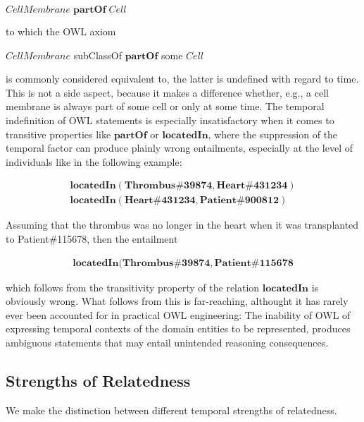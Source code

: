 \documentclass[10pt]{bmc_article}
\newcommand{\mirel}[1]{\ensuremath{\mathrm{\mathbf{#1}}}}
\newcommand{\mclass}[1]{\ensuremath{\mathit{#1}}}
\newenvironment{bmcformat}{\baselineskip20pt\sloppy\setboolean{publ}{false}}{\baselineskip20pt\sloppy}
\begin{document}
\begin{bmcformat}
$\mclass{CellMembrane}\;\mirel{partOf}\;\mclass{Cell}$ 

to which the   
OWL axiom

$\mclass{CellMembrane}$ subClassOf $\mirel{partOf}$ some $\mclass{Cell}$

is commonly considered equivalent to, the latter is 
undefined with regard to time. This is not a side aspect, because it makes a 
difference whether, e.g., a cell membrane is always part of some cell or 
only at some time. 
The temporal indefinition of OWL statements is especially insatisfactory 
when it comes to transitive properties like $\mirel{partOf}$ or $\mirel{locatedIn}$, 
where the suppression of the temporal factor can produce plainly wrong entailments, 
especially at the level of individuals like in the following example: 

\begin{equation}
\begin{split}
\mirel{locatedIn} (\mirel{Thrombus\#39874}, \mirel{Heart\#431234})  \\
\mirel{locatedIn} (\mirel{Heart\#431234}, \mirel{Patient\#900812}) 
\end{split}
\label{eq:trans}
\end{equation}

Assuming that the thrombus was no longer in the heart when it was transplanted to Patient\#115678, then the entailment

\begin{equation}
\begin{split}
\mirel{locatedIn} (\mirel{Thrombus\#39874}, \mirel{Patient\#115678} 
\end{split}
\label{eq:transEntailment}
\end{equation}

which follows from the transitivity property of the relation $\mirel{locatedIn}$ is obviously wrong. 
What follows from this is far-reaching, althought it has rarely ever been accounted for in practical OWL engineering: 
The inability of OWL of expressing temporal contexts of the domain 
entities to be represented, produces ambiguous statements that may entail unintended reasoning consequences. 

\subsection*{Strengths of Relatedness}

We make the distinction between different temporal strengths of relatedness. 


\end{bmcformat}
\end{document}
